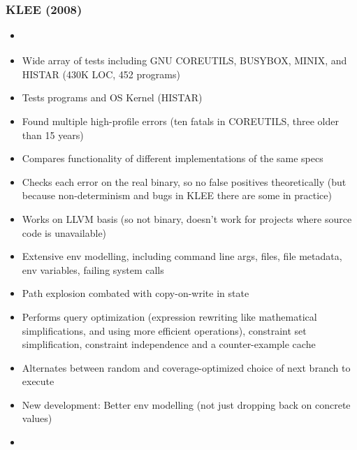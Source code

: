\documentclass{article}
\begin{document}
\subsubsection{KLEE (2008)}
\begin{itemize}
    \item \cite{KLEE}
    \item Wide array of tests including GNU COREUTILS, BUSYBOX, MINIX, and HISTAR (430K LOC, 452 programs)
    \item Tests programs and OS Kernel (HISTAR)
    \item Found multiple high-profile errors (ten fatals in COREUTILS, three older than 15 years)
    \item Compares functionality of different implementations of the same specs
    \item Checks each error on the real binary, so no false positives theoretically (but because non-determinism and bugs in KLEE there are some in practice)
    \item Works on LLVM basis (so not binary, doesn't work for projects where source code is unavailable)
    \item Extensive env modelling, including command line args, files, file metadata, env variables, failing system calls
    \item Path explosion combated with copy-on-write in state
    \item Performs query optimization (expression rewriting like mathematical simplifications, and using more efficient operations), constraint set simplification, constraint independence and a counter-example cache
    \item Alternates between random and coverage-optimized choice of next branch to execute
    \item New development: Better env modelling (not just dropping back on concrete values)
    \item {}\cite{Science}
\end{itemize}
\end{document}
